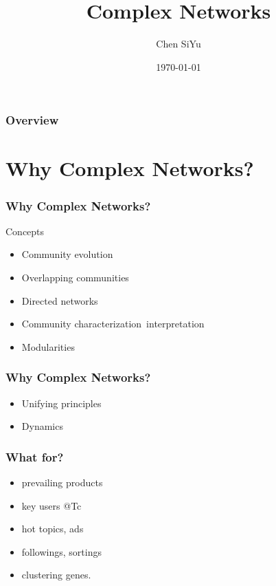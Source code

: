 \documentclass[professionalfonts]{beamer}
\title[Complex Networks]{Complex Networks} %
\author{Chen SiYu} %
\institute[ZJU] %
{
Zhejiang University \\ %
\medskip
\textit{sychen@zju.edu.cn} %
}
\date{\today} %
\begin{document}
\LARGE
\everymath{\displaystyle}


\begin{frame}
\titlepage %
\end{frame}

\begin{frame}
\frametitle{Overview} 
\tableofcontents
\end{frame}



\section{Why Complex Networks?} 
\begin{frame}
\frametitle{Why Complex Networks?}
Concepts
\begin{itemize}
\item Community evolution
\item Overlapping communities
\item Directed networks
\item Community characterization\ interpretation
\item Modularities
\end{itemize}
\end{frame}


\begin{frame}
\frametitle{Why Complex Networks?}
\begin{itemize}
\item Unifying principles
\item Dynamics
\end{itemize}
\end{frame}

\begin{frame}
\frametitle{What for?}
\begin{itemize}
\item prevailing products 
\item key users @Tc
\item hot topics, ads
\item followings, sortings
\item clustering genes.
\end{itemize}
\end{frame}
\end{document}
